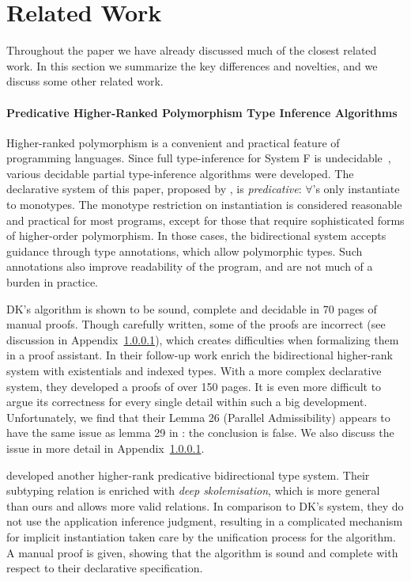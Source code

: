 \section{Related Work}

Throughout the paper we have already discussed much of the closest related work.
In this section we summarize the key differences and novelties, and we discuss some other
related work.

\paragraph{Predicative Higher-Ranked Polymorphism Type Inference Algorithms}
Higher-ranked polymorphism is a convenient and practical feature of
programming languages.  Since full type-inference for System F is
undecidable~\cite{wells1999typability}, various decidable partial
type-inference algorithms were developed.
The declarative system of this paper,
proposed by \citet{dunfield2013complete}, is \emph{predicative}: 
$\forall$'s only instantiate to monotypes.  The monotype restriction
on instantiation is considered reasonable and practical for most
programs, except for those that require sophisticated forms of
higher-order polymorphism.  In those cases, the bidirectional system
accepts guidance through type annotations, which allow polymorphic types.
Such annotations also improve
readability of the program, and are not much of a burden in practice.

DK's algorithm is shown to be sound, complete and decidable in 70 pages of manual proofs.
Though carefully written, some of the proofs are incorrect (see discussion in Appendix~\ref{}),
which creates difficulties when formalizing them in a proof assistant.
In their follow-up work \citet{DunfieldIndexed} enrich the bidirectional higher-rank system with
existentials and indexed types.
With a more complex declarative system, they developed a proofs of over 150 pages.
It is even more difficult to argue its correctness for every single detail within such a big development.
Unfortunately, we find that their Lemma 26 (Parallel Admissibility) appears to have the same issue 
as lemma 29 in \citet{dunfield2013complete}: the conclusion is false. We also discuss
the issue in more detail in Appendix~\ref{}. 

\citet{jones2007practical} developed another higher-rank predicative bidirectional type system.
Their subtyping relation is enriched with \emph{deep skolemisation},
which is more general than ours and allows more valid relations.
In comparison to DK's system, they do not use the application inference judgment,
resulting in a complicated mechanism for implicit instantiation taken care by the unification process for the algorithm.
A manual proof is given, showing that the algorithm is sound and
complete with respect to their declarative specification.

